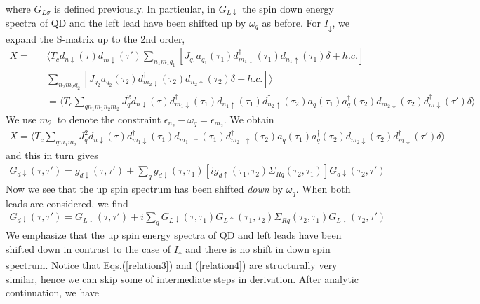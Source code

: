 \documentclass[aps,prb,superscriptaddress]{revtex4-2}
\begin{document}
where $G_{L\sigma}$ is defined previously. In particular, in $G_{L\downarrow}$ the spin down energy spectra of QD and the left lead have been shifted up by $\omega_q$ as before. For $I_\downarrow$, we expand the S-matrix up to the 2nd order,
\begin{eqnarray}
X=&&\langle T_c d_{n\downarrow}(\tau) d^{\dagger}_{m\downarrow}(\tau') \sum_{n_1 m_1 q_1}[J_{q_1} a_{q_1}(\tau_1) d^{\dagger}_{m_1\downarrow}(\tau_1) d_{n_1\uparrow}(\tau_1)\delta +h.c.]\nonumber \\
&&\sum_{n_2 m_2 q_2}[J_{q_2} a_{q_2}(\tau_2) d^{\dagger}_{m_2\downarrow}(\tau_2) d_{n_2\uparrow}(\tau_2)\delta +h.c.]\rangle \nonumber \\
&&=\langle T_c \sum_{q n_1 m_1 n_2 m_2} J_q^2 d_{n\downarrow}(\tau)d^{\dagger}_{m_1\downarrow}(\tau_1) d_{n_1\uparrow}(\tau_1) d^{\dagger}_{n_2\uparrow}(\tau_2) a_{q}(\tau_1) a^\dagger_{q}(\tau_2) d_{m_2\downarrow}(\tau_2) d^{\dagger}_{m\downarrow}(\tau')\delta \rangle \nonumber
\end{eqnarray}
We use $m_2^-$ to denote the constraint $\epsilon_{n_2}-\omega_q= \epsilon_{m_2}$. We obtain
\begin{eqnarray}
X=\langle T_c \sum_{q m_1 m_2} J_q^2 d_{n\downarrow}(\tau)d^{\dagger}_{m_1\downarrow}(\tau_1) d_{{m_1}^-\uparrow}(\tau_1) d^{\dagger}_{{m_2}^-\uparrow}(\tau_2) a_{q}(\tau_1) a^\dagger_{q}(\tau_2) d_{m_2\downarrow}(\tau_2) d^{\dagger}_{m\downarrow}(\tau')\delta \rangle \nonumber
\end{eqnarray}
and this in turn gives
\begin{eqnarray}
 G_{d\downarrow}(\tau,\tau') = g_{d\downarrow}(\tau,\tau') + \sum_q g_{d\downarrow}(\tau,\tau_1) [ig_{d\uparrow}(\tau_1,\tau_2)\Sigma_{Rq}(\tau_2,\tau_1)] G_{d\downarrow}(\tau_2,\tau') \nonumber
\end{eqnarray}
Now we see that the up spin spectrum has been shifted {\it down} by $\omega_q$. When both leads are considered, we find
\begin{eqnarray}
G_{d\downarrow}(\tau,\tau') =G_{L\downarrow}(\tau,\tau') + i\sum_q G_{L\downarrow}(\tau,\tau_1)  G_{L\uparrow}(\tau_1,\tau_2)\Sigma_{Rq}(\tau_2,\tau_1) G_{L\downarrow}(\tau_2,\tau') \nonumber
\end{eqnarray}
We emphasize that the up spin energy spectra of QD and left leads have been shifted down in contrast to the case of $I_\uparrow$ and there is no shift in down spin spectrum. Notice that Eqs.(\ref{relation3}) and (\ref{relation4}) are structurally very similar, hence we can skip some of intermediate steps in derivation. After analytic continuation, we have
\end{document}
